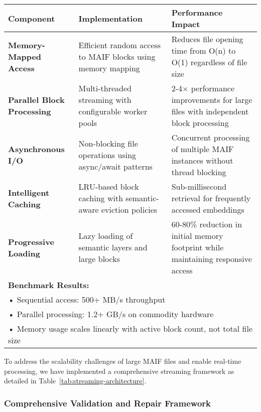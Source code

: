 \documentclass[conference]{IEEEtran}
\begin{document}
\begin{table*}[!t]
\renewcommand{\arraystretch}{1.3}
\caption{MAIF High-Performance Streaming Architecture Components}
\label{tab:streaming-architecture}
\centering
\footnotesize
\begin{tabular}{p{3cm}p{5.5cm}p{5.5cm}}
\toprule
\textbf{Component} & \textbf{Implementation} & \textbf{Performance Impact} \\
\midrule
\textbf{Memory-Mapped Access} & Efficient random access to MAIF blocks using memory mapping & Reduces file opening time from O(n) to O(1) regardless of file size \\
\textbf{Parallel Block Processing} & Multi-threaded streaming with configurable worker pools & 2-4× performance improvements for large files with independent block processing \\
\textbf{Asynchronous I/O} & Non-blocking file operations using async/await patterns & Concurrent processing of multiple MAIF instances without thread blocking \\
\textbf{Intelligent Caching} & LRU-based block caching with semantic-aware eviction policies & Sub-millisecond retrieval for frequently accessed embeddings \\
\textbf{Progressive Loading} & Lazy loading of semantic layers and large blocks & 60-80\% reduction in initial memory footprint while maintaining responsive access \\
\midrule
\multicolumn{3}{l}{\textbf{Benchmark Results:}} \\
\multicolumn{3}{l}{• Sequential access: 500+ MB/s throughput} \\
\multicolumn{3}{l}{• Parallel processing: 1.2+ GB/s on commodity hardware} \\
\multicolumn{3}{l}{• Memory usage scales linearly with active block count, not total file size} \\
\bottomrule
\end{tabular}
\end{table*}

To address the scalability challenges of large MAIF files and enable real-time processing, we have implemented a comprehensive streaming framework as detailed in Table~\ref{tab:streaming-architecture}.

\subsubsection{Comprehensive Validation and Repair Framework}
\end{document}
